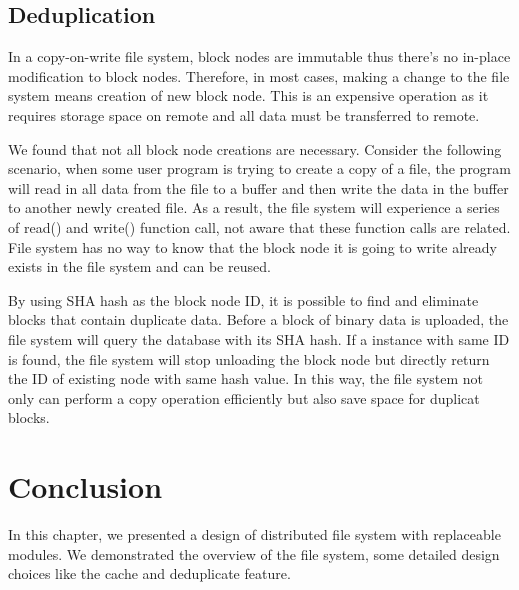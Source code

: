 \subsection{Deduplication}

    In a copy-on-write file system, block nodes are immutable thus there's no in-place modification to block nodes. Therefore, in most cases,  making a change to the file system means creation of new block node. This is an expensive operation as it requires storage space on remote and all data must be transferred to remote.
    
    We found that not all block node creations are necessary. Consider the following scenario, when some user program is trying to create a copy of a file, the program will read in all data from the file to a buffer and then write the data in the buffer to another newly created file. As a result, the file system will experience a series of read() and write() function call, not aware that these function calls are related. File system has no way to know that the block node it is going to write already exists in the file system and can be reused.

    By using SHA hash as the block node ID, it is possible to find and eliminate blocks that contain duplicate data. Before a block of binary data is uploaded, the file system will query the database with its SHA hash. If a instance with same ID is found, the file system will stop unloading the block node but directly return the ID of existing node with same hash value. In this way, the file system not only can perform a copy operation efficiently but also save space for duplicat blocks. 

\section{Conclusion}

    In this chapter, we presented a design of distributed file system with replaceable modules. We demonstrated the overview of the file system, some detailed design choices like the cache and deduplicate feature.
